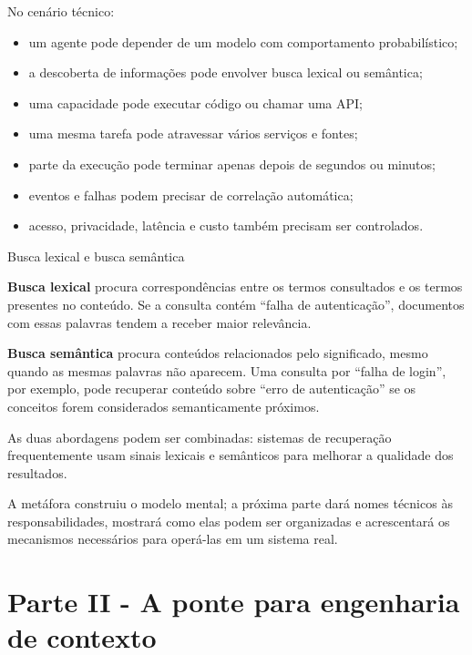 \documentclass[
  10pt,
  a4paper,
  oneside]{book}
\providecommand{\tightlist}{%
  \setlength{\itemsep}{0pt}\setlength{\parskip}{0pt}}
\begin{document}
No cenário técnico:

\begin{itemize}
\tightlist
\item
  um agente pode depender de um modelo com comportamento probabilístico;
\item
  a descoberta de informações pode envolver busca lexical ou semântica;
\item
  uma capacidade pode executar código ou chamar uma API;
\item
  uma mesma tarefa pode atravessar vários serviços e fontes;
\item
  parte da execução pode terminar apenas depois de segundos ou minutos;
\item
  eventos e falhas podem precisar de correlação automática;
\item
  acesso, privacidade, latência e custo também precisam ser controlados.
\end{itemize}

\begin{infobox}{Busca lexical e busca semântica}

\textbf{Busca lexical} procura correspondências entre os termos
consultados e os termos presentes no conteúdo. Se a consulta contém
``falha de autenticação'', documentos com essas palavras tendem a
receber maior relevância.

\textbf{Busca semântica} procura conteúdos relacionados pelo
significado, mesmo quando as mesmas palavras não aparecem. Uma consulta
por ``falha de login'', por exemplo, pode recuperar conteúdo sobre
``erro de autenticação'' se os conceitos forem considerados
semanticamente próximos.

As duas abordagens podem ser combinadas: sistemas de recuperação
frequentemente usam sinais lexicais e semânticos para melhorar a
qualidade dos resultados.

\end{infobox}

A metáfora construiu o modelo mental; a próxima parte dará nomes
técnicos às responsabilidades, mostrará como elas podem ser organizadas
e acrescentará os mecanismos necessários para operá-las em um sistema
real.

\newpage

\hypertarget{parte-ii---a-ponte-para-engenharia-de-contexto}{%
\chapter{Parte II - A ponte para engenharia de
contexto}\label{parte-ii---a-ponte-para-engenharia-de-contexto}}
\end{document}
